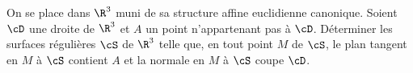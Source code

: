 \begin{enonce}
\begin{exercise}[ID={RMS122-2 E113 X MP},subtitle={},tags={}, difficulty={0}]
On se place dans $\R^3$ muni de sa structure affine euclidienne canonique.
Soient $\cD$ une droite de $\R^3$ et $A$ un point n'appartenant pas à $\cD$.
Déterminer les surfaces régulières $\cS$ de $\R^3$ telle que, en tout point $M$ de $\cS$, le plan tangent en $M$ à $\cS$ contient $A$ et la normale en $M$ à $\cS$ coupe $\cD$.
\end{exercise}
\begin{solution}
\end{solution}
\end{enonce}
